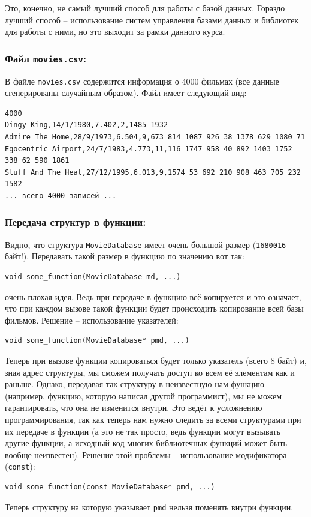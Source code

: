 \documentclass{article}
\begin{document}
Это, конечно, не самый лучший способ для работы с базой данных. Гораздо лучший способ -- использование систем управления базами данных и библиотек для работы с ними, но это выходит за рамки данного курса.

\subsubsection*{Файл \texttt{movies.csv}:}
В файле \texttt{movies.csv} содержится информация о 4000 фильмах (все данные сгенерированы случайным образом). Файл имеет следующий вид:
\begin{verbatim}
4000
Dingy King,14/1/1980,7.402,2,1485 1932
Admire The Home,28/9/1973,6.504,9,673 814 1087 926 38 1378 629 1080 71
Egocentric Airport,24/7/1983,4.773,11,116 1747 958 40 892 1403 1752 338 62 590 1861
Stuff And The Heat,27/12/1995,6.013,9,1574 53 692 210 908 463 705 232 1582
... всего 4000 записей ...
\end{verbatim}

\newpage
\subsubsection*{Передача структур в функции:}
Видно, что структура \texttt{MovieDatabase} имеет очень большой размер (\texttt{1680016} байт!). Передавать такой размер в функцию по значению вот так:
\begin{lstlisting}
void some_function(MovieDatabase md, ...)
\end{lstlisting} 
очень плохая идея. Ведь при передаче в функцию всё копируется и это означает, что при каждом вызове такой функции будет происходить копирование всей базы фильмов. Решение -- использование указателей:
\begin{lstlisting}
void some_function(MovieDatabase* pmd, ...)
\end{lstlisting}
Теперь при вызове функции копироваться будет только указатель (всего 8 байт) и, зная адрес структуры, мы сможем получать доступ ко всем её элементам как и раньше. Однако, передавая так структуру в неизвестную нам функцию (например, функцию, которую написал другой программист), мы не можем гарантировать, что она не изменится внутри. Это ведёт к усложнению программирования, так как теперь нам нужно следить за всеми структурами при их передаче в функции (а это не так просто, ведь функции могут вызывать другие функции, а исходный код многих библиотечных функций может быть вообще неизвестен). Решение этой проблемы -- использование модификатора (\texttt{const}):
\begin{lstlisting}
void some_function(const MovieDatabase* pmd, ...)
\end{lstlisting}
Теперь структуру на которую указывает \texttt{pmd} нельзя поменять внутри функции.
\end{document}

